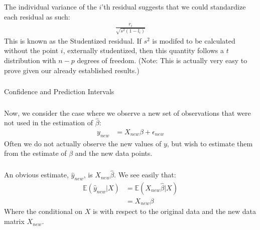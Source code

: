 \begin{frame}[fragile] \frametitle{}

The individual variance of the $i$'th residual suggests that we
could standardize each residual as such:
\begin{align*}
\frac{r_i}{\sqrt{s^2 (1 - l_i)}}
\end{align*}
\pause This is known as the Studentized residual. If $s^2$ is modifed
to be calculated without the point $i$, externally studentized, then
this quantity follows a $t$ distribution with $n-p$ degrees of freedom.
(Note: This is actually very easy to prove given our already established
results.)

\end{frame}

\begin{frame}[fragile] \frametitle{}

\begin{flushright}
{\color{yaleblue}\sc\fontsize{1cm}{0cm}\selectfont Confidence and Prediction Intervals}
\end{flushright}

\end{frame}

\begin{frame}[fragile] \frametitle{}

Now, we consider the case where we observe a new set of
observations that were not used in the estimation of $\widehat{\beta}$:
\begin{align*}
y_{new} &= X_{new} \beta + \epsilon_{new}
\end{align*}
Often we do not actually observe the new values of $y$, but wish
to estimate them from the estimate of $\beta$ and the new
data points.

\end{frame}

\begin{frame}[fragile] \frametitle{}

An obvious estimate, $\hat{y}_{new}$, is $X_{new} \widehat{\beta}$.
\pause We see easily that:
\begin{align*}
\mathbb{E} (\hat{y}_{new} | X) &= \mathbb{E} (X_{new} \widehat{\beta} | X) \\
&= X_{new} \beta
\end{align*}
Where the conditional on $X$ is with respect to the original data and
the new data matrix $X_{new}$.

\end{frame}

